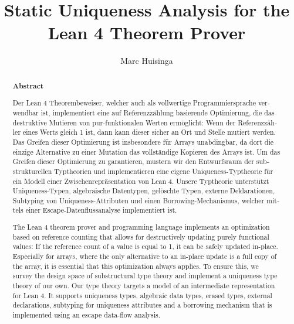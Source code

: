 \documentclass[parskip=no,12pt,a4paper,twoside,headings=openright, fleqn]{scrreprt}
\title{Static Uniqueness Analysis for the Lean 4 Theorem Prover}
\author{Marc Huisinga}
\begin{document}
\begin{otherlanguage}{ngerman} %
\mytitlepage
\end{otherlanguage}

\begin{abstract}
\begin{center}\Huge\textbf{\textsf{Abstract}}
\end{center}
\vfill

\begin{otherlanguage}{ngerman}
Der Lean 4 Theorembeweiser, welcher auch als vollwertige Programmiersprache verwendbar ist, implementiert eine auf Referenzzählung basierende Optimierung, die das destruktive Mutieren von pur-funktionalen Werten ermöglicht: Wenn der Referenzzähler eines Werts gleich 1 ist, dann kann dieser sicher an Ort und Stelle mutiert werden. Das Greifen dieser Optimierung ist insbesondere für Arrays unabdingbar, da dort die einzige Alternative zu einer Mutation das vollständige Kopieren des Arrays ist. Um das Greifen dieser Optimierung zu garantieren, mustern wir den Entwurfsraum der substrukturellen Typtheorien und implementieren eine eigene Uniqueness-Typtheorie für ein Modell einer Zwischenrepräsentation von Lean 4. Unsere Typtheorie unterstützt Uniqueness-Typen, algebraische Datentypen, gelöschte Typen, externe Deklarationen, Subtyping von Uniqueness-Attributen und einen Borrowing-Mechanismus, welcher mittels einer Escape-Datenflussanalyse implementiert ist.
\end{otherlanguage}
\vfill
The Lean 4 theorem prover and programming language implements an optimization based on reference counting that allows for destructively updating purely functional values: If the reference count of a value is equal to 1, it can be safely updated in-place. Especially for arrays, where the only alternative to an in-place update is a full copy of the array, it is essential that this optimization always applies. To ensure this, we survey the design space of substructural type theory and implement a uniqueness type theory of our own. Our type theory targets a model of an intermediate representation for Lean 4. It supports uniqueness types, algebraic data types, erased types, external declarations, subtyping for uniqueness attributes and a borrowing mechanism that is implemented using an escape data-flow analysis.
\vfill
\end{abstract}

\tableofcontents









\end{document}
